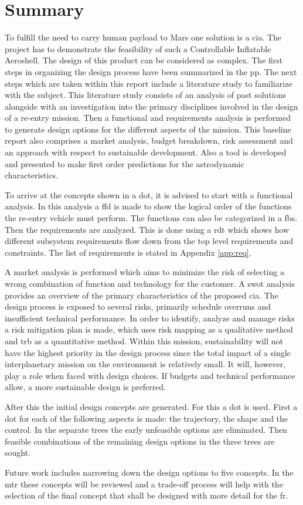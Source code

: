 \section*{Summary}\label{cha:summary}

To fulfill the need to carry human payload to Mars one solution is a \acrfull{cia}. The project has to demonstrate the feasibility of such a Controllable Inflatable Aeroshell. The design of this product can be considered as complex. The first steps in organizing the design process have been summarized in the \acrfull{pp}. The next steps which are taken within this report include a literature study to familiarize with the subject. This literature study consists of an analysis of past solutions alongside with an investigation into the primary disciplines involved in the design of a re-entry mission. Then a functional and requirements analysis is performed to generate design options for the different aspects of the mission. This baseline report also comprises a market analysis, budget breakdown, risk assessment and an approach with respect to sustainable development. Also a tool is developed and presented to make first order predictions for the astrodynamic characteristics. 

To arrive at the concepts shown in a \acrfull{dot}, it is advised to start with a functional analysis. In this analysis a \acrfull{ffd} is made to show the logical order of the functions the re-entry vehicle must perform. The functions can also be categorized in a \acrfull{fbs}. Then the requirements are analyzed. This is done using a \gls{rdt} which shows how different subsystem requirements flow down from the top level requirements and constraints. The list of requirements is stated in Appendix \ref{app:req}.

A market analysis is performed which aims to minimize the risk of selecting a wrong combination of function and technology for the customer. A \acrfull{swot} analysis provides an overview of the primary characteristics of the proposed \gls{cia}. The design process is exposed to several risks, primarily schedule overruns and insufficient technical performance. In order to identify, analyze and manage risks a risk mitigation plan is made, which uses risk mapping as a qualitative method and \gls{trb} as a quantitative method. Within this mission, sustainability will not have the highest priority in the design process since the total impact of a single interplanetary mission on the environment is relatively small. It will, however, play a role when faced with design choices. If budgets and technical performance allow, a more sustainable design is preferred.

After this the initial design concepts are generated. For this a \gls{dot} is used. First a \gls{dot} for each of the following aspects is made: the trajectory, the shape and the control. In the separate trees the early unfeasible options are eliminated. Then feasible combinations of the remaining design options in the three trees are sought.

Future work includes narrowing down the design options to five concepts. In the \acrfull{mtr} these concepts will be reviewed and a trade-off process will help with the selection of the final concept that shall be designed with more detail for the \acrfull{fr}.
